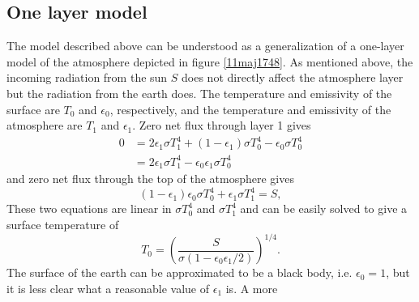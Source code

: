 \documentclass[twocolumn]{article}
\begin{document}
\begin{large}
\subsection*{One layer model}
The model described above can be understood as a generalization of a one-layer model of the atmosphere depicted in figure \ref{11maj1748}. As mentioned above, the incoming radiation from the sun $S$ does not directly affect the atmosphere layer but the radiation from the earth does. The temperature and emissivity of the surface are $T_0$ and $\epsilon_0$, respectively, and the temperature and emissivity of the atmosphere are $T_1$ and $\epsilon_1$. Zero net flux through layer 1 gives 
\begin{equation}
    \label{11maj2007}
    \begin{split}
        0 &= 2\epsilon_1\sigma T_1^4 + (1-\epsilon_1)\sigma T_0^4 - \epsilon_0\sigma T_0^4 \\ 
        &= 2\epsilon_1\sigma T_1^4 - \epsilon_0\epsilon_1\sigma T_0^4
    \end{split}
\end{equation}
and zero net flux through the top of the atmosphere gives 
\begin{equation}
    (1-\epsilon_1)\epsilon_0\sigma T_0^4 + \epsilon_1\sigma T_1^4 = S,
\end{equation}
These two equations are linear in $\sigma T_0^4$ and $\sigma T_1^4$ and can be easily solved to give a surface temperature of 
\begin{equation}
    \label{11maj2008}
    T_0 = \left(\frac{S}{\sigma(1-\epsilon_0\epsilon_1/2)}\right)^{1/4}.
\end{equation}
The surface of the earth can be approximated to be a black body, i.e. $\epsilon_0=1$, but it is less clear what a reasonable value of $\epsilon_1$ is. A more 


\end{large}
\end{document}
